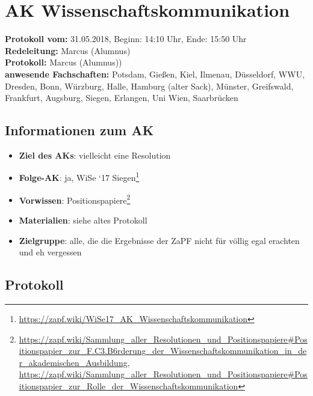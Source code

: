 
\section{AK Wissenschaftskommunikation}

	\textbf{Protokoll vom:} 31.05.2018, %
	Beginn: 14:10 Uhr,
	Ende: 15:50 Uhr \\
	\textbf{Redeleitung:} Marcus (Alumnus) \\
	\textbf{Protokoll:} Marcus (Alumnus)) \\
	\textbf{anwesende Fachschaften:} Potsdam, Gießen, Kiel, Ilmenau, Düsseldorf, WWU, Dresden, Bonn, Würzburg, Halle, Hamburg (alter Sack), Münster, Greifswald, Frankfurt, Augsburg, Siegen, Erlangen, Uni Wien, Saarbrücken

	\subsection*{Informationen zum AK}
		\begin{itemize}
			\item \textbf{Ziel des AKs}: vielleicht eine Resolution
			\item \textbf{Folge-AK}: ja, WiSe `17 Siegen\footnote{\url{https://zapf.wiki/WiSe17_AK_Wissenschaftskommunikation}}
			\item \textbf{Vorwissen}: Positionspapiere\footnote{\url{https://zapf.wiki/Sammlung_aller_Resolutionen_und_Positionspapiere\#Positionspapier_zur_F.C3.B6rderung_der_Wissenschaftskommunikation_in_der_akademischen_Ausbildung}, \url{https://zapf.wiki/Sammlung_aller_Resolutionen_und_Positionspapiere\#Positionspapier_zur_Rolle_der_Wissenschaftskommunikation}}
      \item \textbf{Materialien}: siehe altes Protokoll
			\item \textbf{Zielgruppe}: alle, die die Ergebnisse der ZaPF nicht für völlig egal erachten und eh vergessen
		\end{itemize}

  \subsection*{Protokoll}
